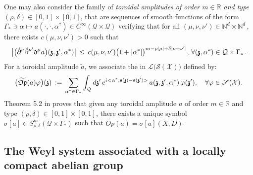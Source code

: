 \documentclass[12pt]{article}
\theoremstyle{definition}
\def\R{\mathbb{R}}
\def\Op{\mathfrak{Op}}
\def\X{\mathcal X}
\def\T{\mathcal{Q}}
\def\s{\mathfrak{s}}
\def\bz{\mathfrak{z}\hspace*{-4pt}\mathfrak{z}}
\def\dd{\mathfrak{d}}
\def\beq{\begin{equation}}
\def\eeq{\end{equation}}
\numberwithin{equation}{section}
\begin{document}
One may also consider the family of \textit{toroidal amplitudes of order $m\in\R$ and type $(\rho,\delta)\in[0,1]\times[0,1]$}, that are sequences of smooth functions of the form $\Gamma_*\ni\alpha\mapsto{a}(\cdot,\cdot,\alpha^*)\in{C}^\infty(\T\times\T)$ verifying that
 for all $(\mu,\nu,\nu')\in\mathbb{N}^d\times\mathbb{N}^d\,,$ there exists $c(\mu,\nu,\nu')>0$ such that
\beq \label{DF-PNf-1}
 \, \big|\big(\mathring{\partial}^\nu\mathring{\partial}^{\nu'}\dd^\mu{a}\big)(\bz,\bz',\alpha^*)\big|\,\leq\,c(\mu,\nu,\nu')\big(1+|\alpha^*|\big)^{m-\rho|\mu|+\delta|\nu+\nu'|},\,
\forall(\bz,\alpha^*)\in\T\times\Gamma_*\,.
\eeq
For a toroidal amplitude $\widetilde{a}$, we associate the in $\mathcal{L}\big(\mathscr{S}(\X)\big)$ defined by:
\beq\label{F-3-6}
\big(\widetilde{\Op}(a)\varphi\big)(\bz)\,:=\,\underset{\alpha^*\in\Gamma_*}{\sum}\int_{\T}d\bz^\prime\,e^{i<\alpha^*,\s(\bz)-\s(\bz^\prime)>}\,a(\bz,\bz',\alpha^*)\,\varphi(\bz^\prime),\quad\forall\varphi\in\mathscr{S}(\X).
\eeq
Theorem 5.2 in \cite{RT-10} proves that given any toroidal amplitude $a$ of order $m\in\R$ and type $(\rho,\delta)\in[0,1]\times[0,1]$, there exists a unique symbol $\sigma[a]\in{S}^m_{\rho,\delta}(\T\times\Gamma_*)$ such that $\widetilde{Op}(a)=\sigma[a](X,D)$.


\subsection{The Weyl system associated with a locally compact abelian group}
\end{document}

